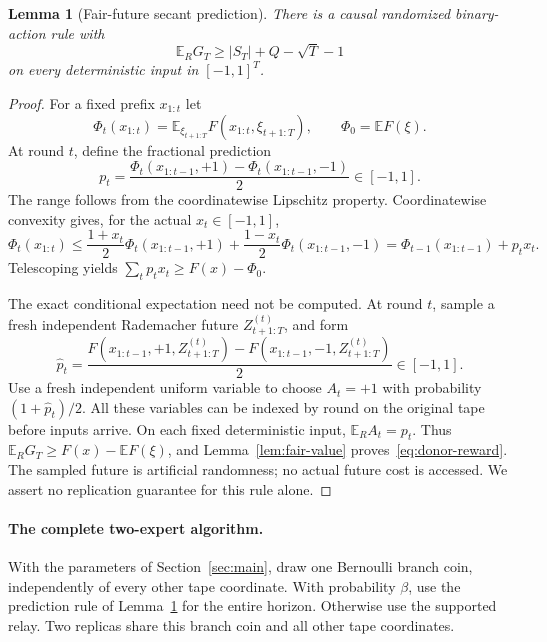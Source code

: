 \documentclass[11pt]{article}
\newtheorem{lemma}[theorem]{Lemma}
\theoremstyle{remark}\newtheorem{remark}[theorem]{Remark}
\newcommand{\EE}{\mathbb E}
\begin{document}
\begin{lemma}[Fair-future secant prediction]\label{lem:donor}
There is a causal randomized binary-action rule with
\begin{equation}\label{eq:donor-reward}
 \EE_R G_T\ge |S_T|+Q-\sqrt T-1
\end{equation}
on every deterministic input in $[-1,1]^T$.
\end{lemma}
\begin{proof}
For a fixed prefix $x_{1:t}$ let
\[
 \Phi_t(x_{1:t})=
 \EE_{\xi_{t+1:T}}F(x_{1:t},\xi_{t+1:T}),
 \qquad \Phi_0=\EE F(\xi).
\]
At round $t$, define the fractional prediction
\[
 p_t=\frac{\Phi_t(x_{1:t-1},+1)-
                \Phi_t(x_{1:t-1},-1)}{2}\in[-1,1].
\]
The range follows from the coordinatewise Lipschitz property.
Coordinatewise convexity gives, for the actual $x_t\in[-1,1]$,
\[
 \Phi_t(x_{1:t})\le
 \frac{1+x_t}{2}\Phi_t(x_{1:t-1},+1)+
 \frac{1-x_t}{2}\Phi_t(x_{1:t-1},-1)
 =\Phi_{t-1}(x_{1:t-1})+p_tx_t.
\]
Telescoping yields
$\sum_t p_tx_t\ge F(x)-\Phi_0$.

The exact conditional expectation need not be computed. At round $t$,
sample a fresh independent Rademacher future $Z^{(t)}_{t+1:T}$, and form
\[
 \widehat p_t=
 \frac{F(x_{1:t-1},+1,Z^{(t)}_{t+1:T})-
       F(x_{1:t-1},-1,Z^{(t)}_{t+1:T})}{2}\in[-1,1].
\]
Use a fresh independent uniform variable to choose $A_t=+1$ with
probability $(1+\widehat p_t)/2$. All these variables can be indexed
by round on the original tape before inputs arrive. On each fixed
deterministic input, $\EE_R A_t=p_t$. Thus
$\EE_R G_T\ge F(x)-\EE F(\xi)$, and
Lemma~\ref{lem:fair-value} proves~\eqref{eq:donor-reward}.
The sampled future is artificial randomness; no actual future cost
is accessed. We assert no replication guarantee for this rule alone.
\end{proof}

\paragraph{The complete two-expert algorithm.}
With the parameters of Section~\ref{sec:main}, draw one Bernoulli
branch coin, independently of every other tape coordinate. With
probability $\beta$, use the prediction rule of Lemma~\ref{lem:donor}
for the entire horizon. Otherwise use the supported relay. Two replicas
share this branch coin and all other tape coordinates.
\end{document}
